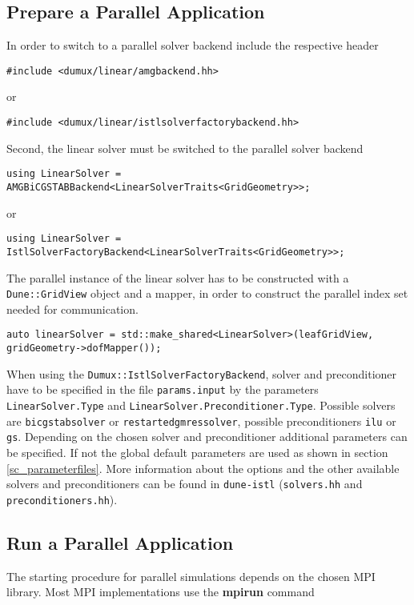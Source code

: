 \subsection{Prepare a Parallel Application}
In order to switch to a parallel solver backend include the respective header

\begin{lstlisting}[style=DumuxCode]
#include <dumux/linear/amgbackend.hh>
\end{lstlisting}
or
\begin{lstlisting}[style=DumuxCode]
#include <dumux/linear/istlsolverfactorybackend.hh>
\end{lstlisting}

Second, the linear solver must be switched to the parallel solver backend

\begin{lstlisting}[style=DumuxCode]
using LinearSolver = AMGBiCGSTABBackend<LinearSolverTraits<GridGeometry>>;
\end{lstlisting}
or
\begin{lstlisting}[style=DumuxCode]
using LinearSolver = IstlSolverFactoryBackend<LinearSolverTraits<GridGeometry>>;
\end{lstlisting}

The parallel instance of the linear solver has to be
constructed with a \texttt{Dune::GridView} object and a mapper, in order to construct the
parallel index set needed for communication.

\begin{lstlisting}[style=DumuxCode]
auto linearSolver = std::make_shared<LinearSolver>(leafGridView, gridGeometry->dofMapper());
\end{lstlisting}

When using the \texttt{Dumux::IstlSolverFactoryBackend}, solver and preconditioner have to be specified
in the file \texttt{params.input} by the parameters \texttt{LinearSolver.Type} and \texttt{LinearSolver.Preconditioner.Type}.
Possible solvers are \texttt{bicgstabsolver} or \texttt{restartedgmressolver}, possible preconditioners \texttt{ilu} or \texttt{gs}.
Depending on the chosen solver and preconditioner additional parameters can be specified.
If not the global default parameters are used as shown in section \ref{sc_parameterfiles}.
More information about the options and the other available solvers and preconditioners can be found in
\texttt{dune-istl} (\texttt{solvers.hh} and \texttt{preconditioners.hh}).

\subsection{Run a Parallel Application}
The starting procedure for parallel simulations depends on the chosen MPI library.
Most MPI implementations use the \textbf{mpirun} command

